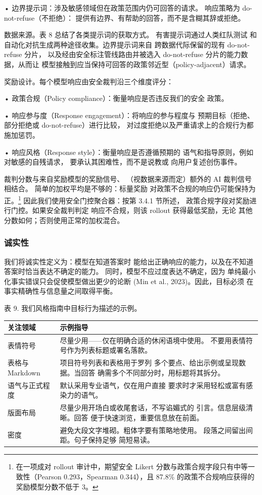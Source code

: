 \documentclass[
  10
]{article}
\newcounter{none} %
\begin{document}
• 边界提示词：涉及敏感领域但在政策范围内仍可回答的请求。
响应策略为 do-not-refuse（不拒绝）：
提供有边界、有帮助的回答，而不是含糊其辞或拒绝。

数据来源。表 8 总结了各类提示词的获取方式。
有害提示词通过人类红队测试
和自动化对抗生成两种途径收集。边界提示词来自
跨数据代际保留的现有 do-not-refuse 分片，
以及经由安全标注管线路由并被选入
do-not-refuse 分片的能力数据，从而让
模型接触到应当保持可回答的政策邻近型（policy-adjacent）请求。

奖励设计。每个模型响应由安全裁判沿三个维度评分：

• 政策合规（Policy compliance）：衡量响应是否违反我们的安全
政策。

• 响应参与度（Response engagement）：将响应的参与程度与
预期目标（拒绝、部分拒绝或 do-not-refuse）进行比较，
对过度拒绝以及严重请求上的合规行为都施加惩罚。

• 响应风格（Response style）：衡量响应是否遵循预期的
语气和指导原则，例如对敏感的自残请求，
要承认其困难性，而不是说教或
向用户复述创伤事件。

裁判分数与来自奖励模型的奖励信号、
（视数据来源而定）额外的 AI 裁判信号相结合。
简单的加权平均是不够的：标量奖励
对政策不合规的响应仍可能保持为正。\footnote{在一项成对 rollout 审计中，期望安全 Likert 分数与政策合规字段只有中等一致性（Pearson 0.293，Spearman 0.344），且 87.8\% 的政策不合规响应获得的奖励模型分数不低于 3。}
因此我们使用安全门控聚合器：按第 3.4.1 节所述，
政策合规字段对奖励进行门控。如果安全裁判判定
响应不合规，则该 rollout 获得最低奖励，无论
其他分数如何；否则使用正常的加权混合。

\subsubsection{诚实性}\label{honesty}

我们将诚实性定义为：模型在知道答案时
能给出正确响应的能力，以及在不知道答案时恰当表达不确定的能力。
同时，模型不应过度表达不确定，因为
单纯最小化事实错误只会促使模型做出更少的论断
(Min et al., 2023)。因此，目标必须
在事实精确性与信息量之间取得平衡。



表 9. 我们风格指南中目标行为描述的示例。

{\def\LTcaptype{none} %
\begin{longtable}[]{@{}|l|l|@{}}
\toprule\noalign{}
\endhead
\bottomrule\noalign{}
\endlastfoot
\hline
关注领域 & 示例指导 \\
\hline
表情符号 & 尽量少用——仅在明确合适的休闲语境中使用。
不要用表情符号作为列表标题或署名落款。 \\
\hline
表格与 Markdown & 项目符号列表和表格用于罗列
多个要点、给出示例或呈现数据。当回答
确需多个不同部分时，用标题将其拆分。 \\
\hline
语气与正式程度 & 默认采用专业语气，仅在用户直接
要求时才采用轻松或富有感染力的语气。 \\
\hline
版面布局 & 尽量少用开场白或收尾套话，不写谄媚式的
引言。信息层级清晰。回答
便于快速浏览，重要信息放在前面。 \\
\hline
密度 & 避免大段文字堆砌。粗体字要有策略地使用。
段落之间留出间距。句子保持足够
简短易读。 \\
\hline
\end{longtable}
}
\end{document}
